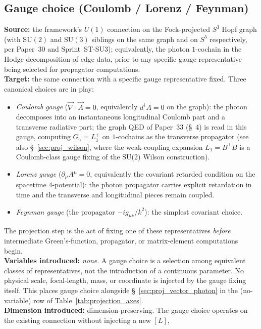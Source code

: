 \documentclass[11pt]{article}
\begin{document}
\subsection{Gauge choice (Coulomb / Lorenz / Feynman)}
\label{sec:proj_gauge_choice}
\textbf{Source:} the framework's $U(1)$ connection on the Fock-projected
$S^3$ Hopf graph (with $\mathrm{SU}(2)$ and $\mathrm{SU}(3)$ siblings
on the same graph and on $S^5$ respectively, per Paper~30 and
Sprint~ST-SU3); equivalently, the photon $1$-cochain in the Hodge
decomposition of edge data, prior to any specific gauge representative
being selected for propagator computations.\\
\textbf{Target:} the same connection with a specific gauge
representative fixed.  Three canonical choices are in play:
\begin{itemize}\setlength{\itemsep}{2pt}
\item \emph{Coulomb gauge} ($\vec{\nabla} \cdot \vec{A} = 0$,
equivalently $d^\dagger A = 0$ on the graph): the photon decomposes
into an instantaneous longitudinal Coulomb part and a transverse
radiative part; the graph QED of Paper~33 (\S~4) is read in this
gauge, computing $G_\gamma = L_1^+$ on $1$-cochains as the transverse
propagator
(see also \S~\ref{sec:proj_wilson}, where the weak-coupling expansion
$L_1 = B^\top B$ is a Coulomb-class gauge fixing of the SU(2) Wilson
construction).
\item \emph{Lorenz gauge} ($\partial_\mu A^\mu = 0$, equivalently the
covariant retarded condition on the spacetime $4$-potential): the
photon propagator carries explicit retardation in time and the
transverse and longitudinal pieces remain coupled.
\item \emph{Feynman gauge} (the propagator $-i g_{\mu\nu}/k^2$): the
simplest covariant choice.
\end{itemize}
The projection step is the act of fixing one of these representatives
\emph{before} intermediate Green's-function, propagator, or matrix-element
computations begin.\\
\textbf{Variables introduced:} \emph{none}.  A gauge choice is a
selection among equivalent classes of representatives, not the
introduction of a continuous parameter.  No physical scale,
focal-length, mass, or coordinate is injected by the gauge fixing
itself.  This places gauge choice alongside \S~\ref{sec:proj_vector_photon}
in the (no-variable) row of Table~\ref{tab:projection_axes}.\\
\textbf{Dimension introduced:} dimension-preserving.  The gauge choice
operates on the existing connection without injecting a new $[L]$,
\end{document}
